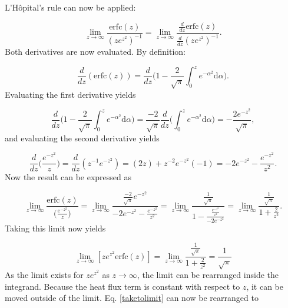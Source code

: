\documentclass{article}
\begin{document}
\noindent L’Hôpital’s rule can now be applied:

\begin{equation}
     \lim_{z\rightarrow\infty}\frac{ \text{erfc}(z)}{ (ze^{z^2})^{-1}} =  \lim_{z\rightarrow\infty}\frac{\frac{d}{dz}\text{erfc}(z)}{\frac{d}{dz}(ze^{z^2})^{-1}}.
\end{equation}
Both derivatives are now evaluated. By definition:

\begin{equation}
    \frac{d}{dz}(\text{erfc}(z)) = \frac{d}{dz} \bigg(1-\frac{2}{\sqrt{\pi}}\int_{0}^{z} e^{-\alpha^2}\text{d}\alpha\bigg).
\end{equation}
Evaluating the first derivative yields

\begin{equation}
    \frac{d}{dz} \bigg(1-\frac{2}{\sqrt{\pi}}\int_{0}^{z} e^{-\alpha^2}\text{d}\alpha\bigg) = \frac{-2}{\sqrt{\pi}}\frac{d}{dz}\bigg(\int_{0}^{z} e^{-\alpha^2}\text{d}\alpha\bigg) = -\frac{2e^{-z^2}}{\sqrt{\pi}},
\end{equation}
and evaluating the second derivative yields

\begin{equation}
    \frac{d}{dz}\bigg(\frac{e^{-z^2}}{z}\bigg) = \frac{d}{dz}(z^{-1}e^{-z^2})=(2z)+z^{-2}e^{-z^2}(-1) = -2e^{-z^2} - \frac{e^{-z^2}}{z^2}.
\end{equation}
Now the result can be expressed as 

\begin{equation}
    \lim_{z\rightarrow\infty}\frac{ \text{erfc}(z)}{\bigg(\frac{e^{-z^2}}{z}\bigg)} =  \lim_{z\rightarrow\infty}\frac{\frac{-2}{\sqrt{\pi}}e^{-z^2}}{-2e^{-z^2} - \frac{e^{-z^2}}{z^2}} = \lim_{z\rightarrow\infty} \frac{\frac{1}{\sqrt{\pi}}}{1-\frac{\frac{e^{-z^2}}{z^2}}{-2e^{-z^2}}}=\lim_{z\rightarrow\infty} \frac{\frac{1}{\sqrt{\pi}}}{1+\frac{2}{z^2}}.
\end{equation}
Taking this limit now yields

\begin{equation}
 \lim_{z\rightarrow\infty} [ze^{z^2}\text{erfc}(z)]
 = \lim_{z\rightarrow\infty} \frac{\frac{1}{\sqrt{\pi}}}{1+\frac{2}{z^2}}  
 = \frac{1}{\sqrt{\pi}}
 \label{limiteval}
\end{equation}
As the limit exists for $ze^{z^2}$ as $z \rightarrow \infty$, the limit can be rearranged inside the integrand. Because the heat flux term is constant with respect to $z$, it can be moved outside of the limit. Eq. \eqref{taketolimit} can now be rearranged to
\end{document}
